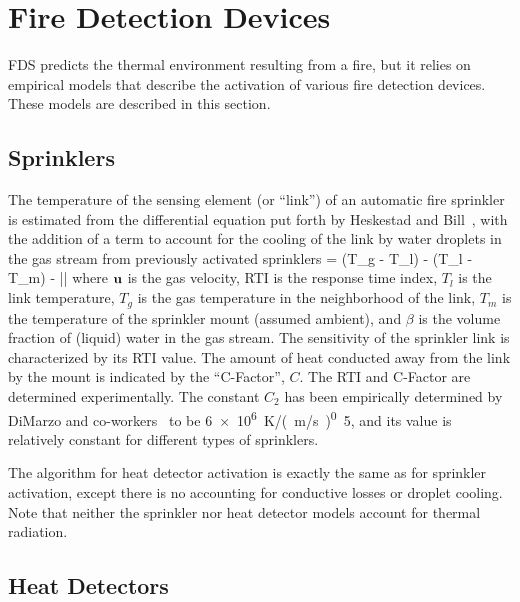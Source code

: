 

\chapter{Fire Detection Devices}

FDS predicts the thermal environment resulting from a fire, but it relies on empirical models that describe the
activation of various fire detection devices. These models are described in this section.


\section{Sprinklers}

The temperature of the sensing element (or ``link'') of an automatic fire sprinkler is estimated from
the differential equation put forth by Heskestad and Bill~\cite{Heskestad:3},
with the addition of a term to account for the cooling of the link
by water droplets in the gas stream from previously activated
sprinklers
\be {} =  (T_g - T_l) -
    (T_l - T_m) -  \beta |\bu|
   \label{actode} \ee
where ${\mathbf{u}}$ is the gas velocity, RTI is the response time index, $T_l$ is the link temperature,
$T_g$ is the gas temperature in the neighborhood of the link,
$T_m$ is the temperature of the sprinkler mount (assumed ambient),
and $\beta$ is the volume fraction of (liquid) water in the
gas stream. The sensitivity of the sprinkler link is characterized by
its RTI value. The amount of heat conducted away from the
link by the mount is indicated by the ``C-Factor'', $C$. The RTI and
C-Factor are determined experimentally. The constant
$C_2$ has been empirically determined by DiMarzo and
co-workers~\cite{Ruffino:1,Ruffino:2,Gavelli:1} to
be \SI{6e6}{K/(m/s)^0.5}, and its value is relatively constant
for different types of sprinklers.

The algorithm for heat detector activation is exactly the same as for
sprinkler activation, except there is no accounting for conductive losses or
droplet cooling. Note that neither the sprinkler nor heat detector models account for
thermal radiation.

\section{Heat Detectors}

